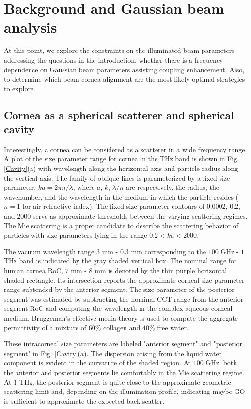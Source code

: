 \documentclass{osa-article}
\begin{document}
\section{Background and Gaussian beam analysis}

At this point, we explore the constraints on the illuminated beam parameters addressing the questions in the introduction, whether there is a frequency dependence on Gaussian beam parameters assisting coupling enhancement. Also, to determine which beam-cornea alignment are the most likely optimal strategies to explore.

\subsection{Cornea as a spherical scatterer and spherical cavity}

Interestingly, a cornea can be considered as a scatterer in a wide frequency range. A plot of the size parameter range for cornea in the THz band is shown in Fig. \ref{Cavity}(a) with wavelength along the horizontal axis and particle radius along the vertical axis. The family of oblique lines is parameterized by a fixed size parameter, $ka=2πn/ \lambda$, where $a$, $k$, $\lambda/n$ are respectively, the radius, the wavenumber, and the wavelength in the medium in which the particle resides ($n = 1$ for air refractive index). The fixed size parameter contours of $0.0002$, $0.2$, and $2000$ serve as approximate thresholds between the varying scattering regimes. The Mie scattering is a proper candidate to describe the scattering behavior of particles with size parameters lying in the range $0.2< ka < 2000$.

The vacuum wavelength range $3$ mm - $0.3$ mm corresponding to the $100$ GHz - $1$ THz band is indicated by the gray shaded vertical box. The nominal range for human cornea RoC, $7$ mm - $8$ mm is denoted by the thin purple horizontal shaded rectangle. Its intersection reports the approximate corneal size parameter range subtended by the anterior segment. The size parameter of the posterior segment was estimated by subtracting the nominal CCT range from the anterior segment RoC and computing the wavelength in the complex aqueous corneal medium. Bruggeman's effective media theory \cite{ari} is used to compute the aggregate permittivity of a mixture of $60\%$ collagen and $40\%$ free water. 

These intracorneal size parameters are labeled "anterior segment" and "posterior segment" in Fig. \ref{Cavity}(a). The dispersion arising from the liquid water component is evident in the curvature of the shaded region. At $100$ GHz, both the anterior and posterior segments lie comfortably in the Mie scattering regime. At $1$ THz, the posterior segment is quite close to the approximate geometric scattering limit and, depending on the illumination profile, indicating maybe GO is sufficient to approximate the expected back-scatter.
\end{document}
